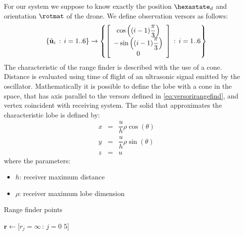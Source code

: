 For our system we suppose to know exactly the position $\hexastate_d$ and orientation $\rotmat$ of the drone. We define observation versors as follows:
\begin{equation}
\label{eq:versorirangefind}
\left\{ \hat{\mathbf{u}}_i \,:\, i=1..6 \right\} \rightarrow \left\{ \left[\begin{array}{c}\cos\left( (i-1)\dfrac{\pi}{3} \right) \\ -\sin\left( (i-1)\dfrac{\pi}{3} \right) \\0\end{array}\right] \,:\, i=1..6 \right\}
\end{equation}
The characteristic of the range finder is described with the use of a cone. Distance is evaluated using time of flight of an ultrasonic signal emitted by the oscillator. Mathematically it is possible to define the lobe with a cone in the space, that has axis parallel to the versors defined in \ref{eq:versorirangefind}, and vertex coincident with receiving system. The solid that approximates the characteristic lobe is defined by:
\begin{equation}
\begin{array}{rcl}
x &=& \dfrac{u}{h} \rho \cos(\theta) \\
y &=& \dfrac{u}{h} \rho \sin(\theta) \\
z &=& u
\end{array}
\end{equation}
where the parameters:
\begin{itemize}
\item $h$: receiver maximum distance
\item $\rho$: receiver maximum lobe dimension
\end{itemize}

\begin{algorithm}[h]
\caption{Range finder points}
$\mathbf{r} \leftarrow [r_j = \infty\,:\,j=0$ \KwTo $5]$\;
\end{algorithm}

